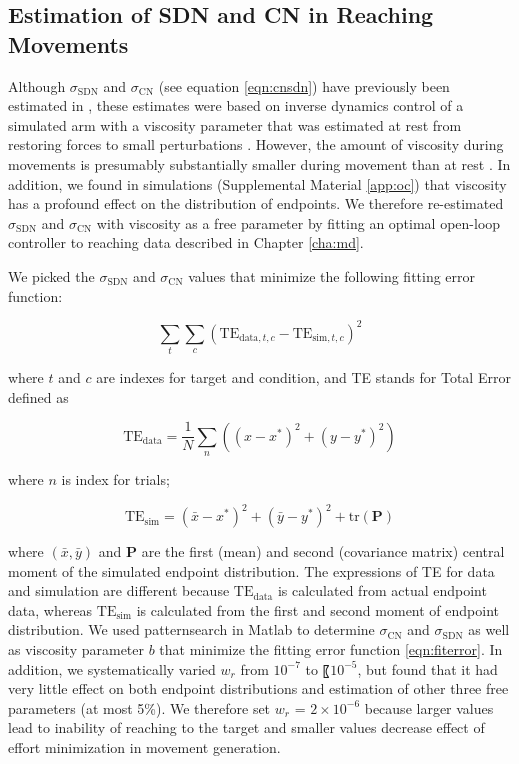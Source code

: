 \subsection{Estimation of SDN and CN in Reaching Movements}
Although $\sigma_{\text{SDN}}$ and $\sigma_{\text{CN}}$ (see equation \ref{eqn:cnsdn}) have previously been estimated in \cite{VanBeers2004}, these estimates were based on inverse dynamics control of a simulated arm with a viscosity parameter that was estimated at rest from restoring forces to small perturbations \cite{Gomi1998}. 
However, the amount of viscosity during movements is presumably substantially smaller during movement than at rest \cite{Burdet2013}. 
In addition, we found in simulations (Supplemental Material \ref{app:oc}) that viscosity has a profound effect on the distribution of endpoints.  
We therefore re-estimated $\sigma_{\text{SDN}}$ and $\sigma_{\text{CN}}$ with viscosity as a free parameter by fitting an optimal open-loop controller to reaching data described in Chapter \ref{cha:md}.

We picked the $\sigma_{\text{SDN}}$ and $\sigma_{\text{CN}}$ values that minimize the following fitting error function:

\begin{equation}
\label{eqn:fiterror}
\sum_{t}\sum_{c} (\text{TE}_{\text{data},t,c} - \text{TE}_{\text{sim},t,c})^2
\end{equation}

where $t$ and $c$ are indexes for target and condition, and TE stands for Total Error defined as 

\begin{equation}
\text{TE}_{\text{data}} = \frac1N\sum_n \left( (x - x^*)^2 + (y - y^*)^2 \right) 
\end{equation}

where $n$ is index for trials;

\begin{equation}
\text{TE}_{\text{sim}} = (\bar{x} - x^*)^2 + (\bar{y} - y^*)^2 + \text{tr}(\bm{P})
\end{equation}

where $(\bar{x},\bar{y})$ and $\bm{P}$ are the first (mean) and second (covariance matrix) central moment of the simulated endpoint distribution. 
The expressions of TE for data and simulation are different because $\text{TE}_{\text{data}}$ is calculated from actual endpoint data, whereas $\text{TE}_{\text{sim}}$ is calculated from the first and second moment of endpoint distribution.
We used \textsf{patternsearch} in Matlab to determine $\sigma_{\text{CN}}$ and $\sigma_{\text{SDN}}$ as well as viscosity parameter $ b $ that minimize the fitting error function \ref{eqn:fiterror}. 
In addition, we systematically varied $ w_r $ from $ 10^{-7} $ to 〖$ 10^{-5} $, but found that it had very little effect on both endpoint distributions and estimation of other three free parameters (at most 5\%). We therefore set $ w_r $ = $ 2\times 10^{-6} $ because larger values lead to inability of reaching to the target and smaller values decrease effect of effort minimization in movement generation. 
		
